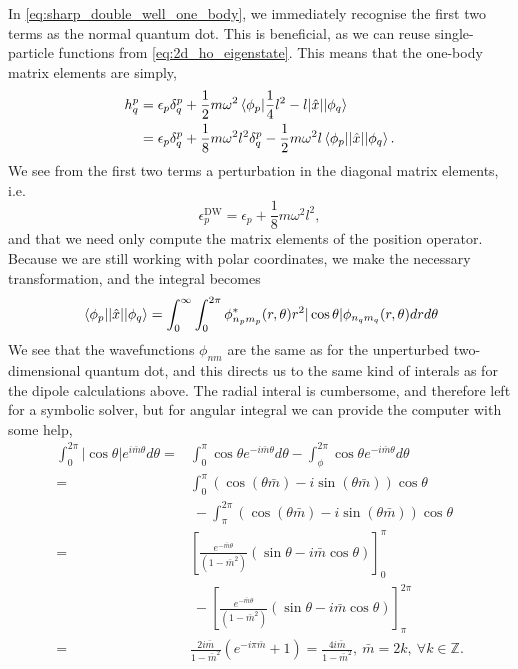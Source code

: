 In \autoref{eq:sharp_double_well_one_body}, we immediately recognise 
the first two terms as the normal quantum dot. This is beneficial, as we 
can reuse single-particle functions from \autoref{eq:2d_ho_eigenstate}.
This means that the one-body matrix elements are simply,
\begin{equation}
    \begin{aligned}
    h^p_q &= \epsilon_p\delta^p_q + \frac{1}{2}m\omega^2
        \mel{\phi_p}{\frac{1}{4}l^2 - l |\hat{x}|}{\phi_q} \\ 
    &= \epsilon_p\delta^p_q + \frac{1}{8}m \omega^2l^2\delta^p_q 
        - \frac{1}{2} m \omega^2l \mel{\phi_p}{|\hat{x}|}{\phi_q}.
    \end{aligned}
\end{equation}
We see from the first two terms a perturbation in the diagonal matrix 
elements, i.e. 
\begin{equation}
    \epsilon_p^{\text{DW}} = \epsilon_p + \frac{1}{8}m\omega^2l^2,
\end{equation}
and that we need only compute the matrix elements of the position operator.
Because we are still working with polar coordinates, we make the necessary 
transformation, and the integral becomes
\begin{equation}
    \mel{\phi_p}{|\hat{x}|}{\phi_q} 
    = \int_0^\infty \int_0^{2\pi} 
        \phi_{n_pm_p}^*(r,\theta) r^2 |\cos\theta| \phi_{n_qm_q}(r,\theta)
    drd\theta
\end{equation}
We see that the wavefunctions $\phi_{nm}$ are the same as for the unperturbed 
two-dimensional quantum dot, and this directs us to the same kind of interals 
as for the dipole calculations above. The radial interal is cumbersome, and
therefore left for a symbolic solver, but for angular integral we can provide 
the computer with some help, 
\begin{equation}
    \begin{aligned}
    \int_0^{2\pi} |\cos\theta| e^{i\bar{m}\theta} d\theta
    =& \int_0^\pi \cos\theta e^{-i\bar{m}\theta} d\theta
        - \int_\phi^{2\pi} \cos\theta e^{-i\bar{m}\theta} d\theta \\
    =& \int_0^\pi \left(\cos(\theta\bar{m}) - i\sin(\theta\bar{m})\right)\cos\theta \\
    &\ -
    \int_\pi^{2\pi} \left(\cos(\theta\bar{m}) - i\sin(\theta\bar{m})\right)\cos\theta \\
    =& \left[\frac{e^{-\bar{m}\theta}}{(1 - \bar{m}^2)} 
        \left(\sin\theta -i\bar{m}\cos\theta\right)\right]_0^\pi \\
    &\ -
    \left[\frac{e^{-\bar{m}\theta}}{(1 - \bar{m}^2)} 
        \left(\sin\theta -i\bar{m}\cos\theta\right)\right]_\pi^{2\pi} \\
    =&
    \frac{2i\bar{m}}{1 - \bar{m}^2} (e^{-i\pi\bar{m}} + 1)
    = \frac{4i\bar{m}}{1 - \bar{m}^2}, \ \bar{m} = 2k, \ \forall k\in\mathbb{Z}.
    \end{aligned}
\end{equation}

